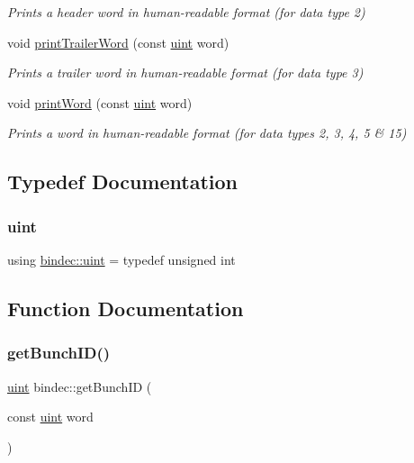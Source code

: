 \begin{DoxyCompactItemize}
\begin{DoxyCompactList}\small\item\em Prints a header word in human-\/readable format (for data type 2) \end{DoxyCompactList}\item 
void \hyperlink{namespacebindec_a7d697577845df9e5e04a8fbbc118dcc5}{print\+Trailer\+Word} (const \hyperlink{namespacebindec_a61700e6ffcfc677215bfdf223803e735}{uint} word)
\begin{DoxyCompactList}\small\item\em Prints a trailer word in human-\/readable format (for data type 3) \end{DoxyCompactList}\item 
void \hyperlink{namespacebindec_ac6d286aca6c2fa2fa29938e4d8247cfa}{print\+Word} (const \hyperlink{namespacebindec_a61700e6ffcfc677215bfdf223803e735}{uint} word)
\begin{DoxyCompactList}\small\item\em Prints a word in human-\/readable format (for data types 2, 3, 4, 5 \& 15) \end{DoxyCompactList}\end{DoxyCompactItemize}


\subsection{Typedef Documentation}
\mbox{\label{namespacebindec_a61700e6ffcfc677215bfdf223803e735}} 
\subsubsection{\texorpdfstring{uint}{uint}}
{\footnotesize\ttfamily using \hyperlink{namespacebindec_a61700e6ffcfc677215bfdf223803e735}{bindec\+::uint} = typedef unsigned int}



\subsection{Function Documentation}
\mbox{\label{namespacebindec_ad029aeb7b485d578e5f3ce91a9cf85f6}} 
\subsubsection{\texorpdfstring{get\+Bunch\+I\+D()}{getBunchID()}}
{\footnotesize\ttfamily \hyperlink{namespacebindec_a61700e6ffcfc677215bfdf223803e735}{uint} bindec\+::get\+Bunch\+ID (\begin{DoxyParamCaption}\item[{const \hyperlink{namespacebindec_a61700e6ffcfc677215bfdf223803e735}{uint}}]{word }\end{DoxyParamCaption})\hspace{0.3cm}{\ttfamily [inline]}}



